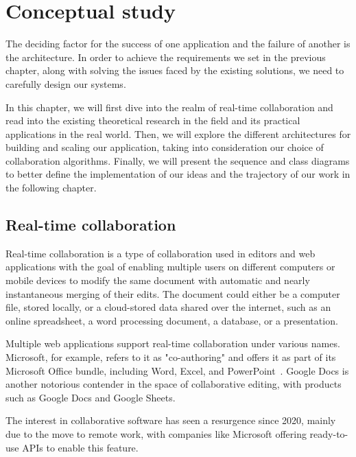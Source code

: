 \chapter{Conceptual study}
\label{chap:conceptual}

\begin{toexclude}
	The deciding factor for the success of one application and the failure of another is the architecture.
	In order to achieve the requirements we set in the previous chapter, along with solving the issues faced by the existing solutions, we need to carefully design our systems.

	In this chapter, we will first dive into the realm of real-time collaboration and read into the existing theoretical research in the field and its practical applications in the real world.
	Then, we will explore the different architectures for building and scaling our application, taking into consideration our choice of collaboration algorithms.
	Finally, we will present the sequence and class diagrams to better define the implementation of our ideas and the trajectory of our work in the following chapter.

	\section{Real-time collaboration}

	Real-time collaboration is a type of collaboration used in editors and web applications with the goal of enabling multiple users on different computers or mobile devices to modify the same document with automatic and nearly instantaneous merging of their edits.
	The document could either be a computer file, stored locally, or a cloud-stored data shared over the internet, such as an online spreadsheet, a word processing document, a database, or a presentation.

	Multiple web applications support real-time collaboration under various names.
	Microsoft, for example, refers to it as "co-authoring" and offers it as part of its Microsoft Office bundle, including Word, Excel, and PowerPoint~\autocite{noauthor_document_nodate}.
	Google Docs is another notorious contender in the space of collaborative editing, with products such as Google Docs and Google Sheets.

	The interest in collaborative software has seen a resurgence since 2020, mainly due to the move to remote work, with companies like Microsoft offering ready-to-use APIs to enable this feature.


\end{toexclude}
